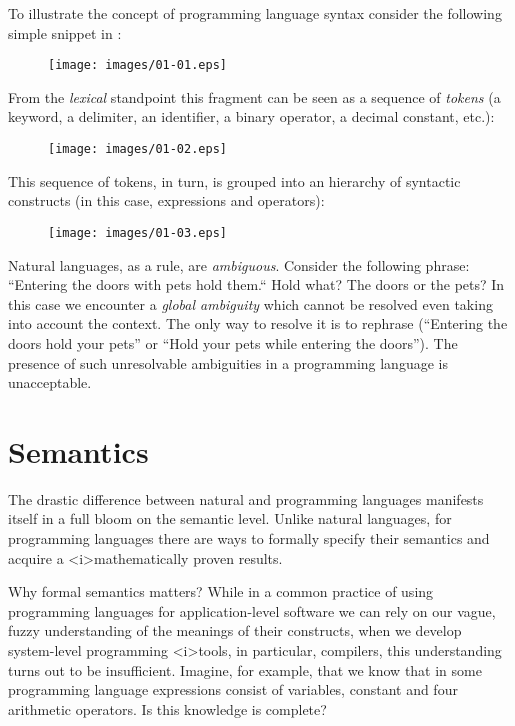 To illustrate the concept of programming language syntax consider the following simple snippet in :

\begin{figure}[h]
  \centering
  \texttt{[image: images/01-01.eps]}
\end{figure}

From the \emph{lexical} standpoint this fragment can be seen as a sequence of \emph{tokens} (a keyword, a delimiter, an identifier, a binary operator,
a decimal constant, etc.):

\begin{figure}[h]
  \centering
  \texttt{[image: images/01-02.eps]}
\end{figure}

This sequence of tokens, in turn, is grouped into an hierarchy of syntactic constructs (in this case, expressions and operators):

\begin{figure}[h]
  \centering
  \texttt{[image: images/01-03.eps]}
\end{figure}

Natural languages, as a rule, are \emph{ambiguous}. Consider the following phrase: ``Entering the doors with pets hold them.`` Hold what? The doors or the pets?
In this case we encounter a \emph{global ambiguity} which cannot be resolved even taking into account the context. The only way to resolve it is to
rephrase (``Entering the doors hold your pets'' or ``Hold your pets while entering the doors''). The presence of such unresolvable ambiguities in a
programming language is unacceptable.

\section{Semantics}
\label{intro-semantics}

The drastic difference between natural and programming languages manifests itself in a full bloom on the semantic level. Unlike natural languages,
for programming languages there are ways to formally specify their semantics and acquire a <i>mathematically proven results.

Why formal semantics matters? While in a common practice of using programming languages for application-level software we can rely on our vague, fuzzy
understanding of the meanings of their constructs, when we develop system-level programming <i>tools, in particular, compilers, this understanding
turns out to be insufficient. Imagine, for example, that we know that in some programming language expressions consist of variables, constant and four
arithmetic operators. Is this knowledge is complete?

